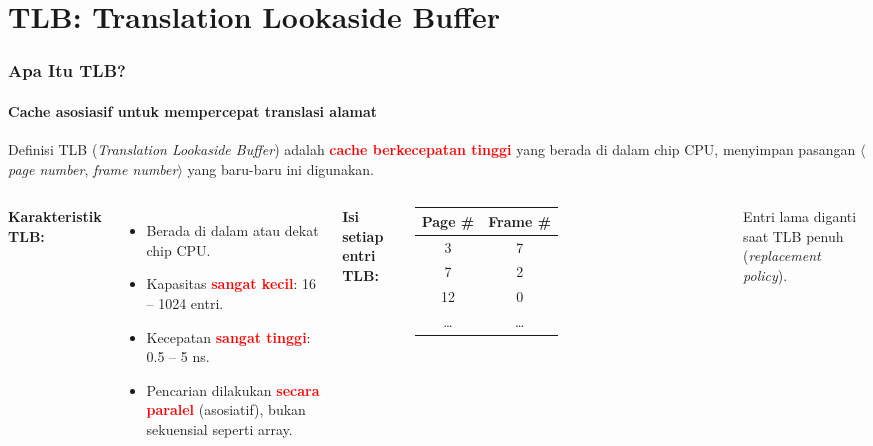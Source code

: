 \documentclass[t,aspectratio=169,xcolor=dvipsnames]{beamer}
\newcommand{\tem}[1]{\textbf{\textcolor{red}{#1}}}
\begin{document}
\section{TLB: Translation Lookaside Buffer}

\begin{frame}
    \frametitle{Apa Itu TLB?}
    \framesubtitle{Cache asosiasif untuk mempercepat translasi alamat}
    \small

    \begin{block}{Definisi}
        TLB (\textit{Translation Lookaside Buffer}) adalah \tem{cache berkecepatan tinggi} yang berada
        di dalam chip CPU, menyimpan pasangan $\langle$\textit{page number}, \textit{frame number}$\rangle$
        yang baru-baru ini digunakan.
    \end{block}

    \vspace{0.25cm}
    \begin{columns}[T]
        \textbf{Karakteristik TLB:}
        \begin{itemize}
            \item Berada di dalam atau dekat chip CPU.
            \item Kapasitas \tem{sangat kecil}: 16 -- 1024 entri.
            \item Kecepatan \tem{sangat tinggi}: 0.5 -- 5 ns.
            \item Pencarian dilakukan \tem{secara paralel} (asosiatif), bukan sekuensial seperti array.
        \end{itemize}

        \textbf{Isi setiap entri TLB:}

        \vspace{0.15cm}
        \begin{tabular}{|c|c|}
            \hline
            \textbf{Page \#} & \textbf{Frame \#} \\
            \hline
            3  & 7  \\
            \hline
            7  & 2  \\
            \hline
            12 & 0  \\
            \hline
            \ldots & \ldots \\
            \hline
        \end{tabular}

        \vspace{0.15cm}
        \footnotesize Entri lama diganti saat TLB penuh (\textit{replacement policy}).
    \end{columns}
\end{frame}
\end{document}
